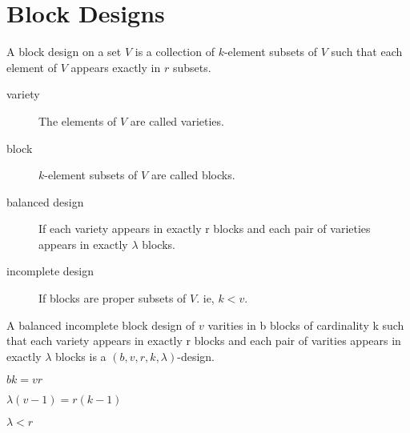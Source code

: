 
\section{Block Designs}
\begin{definition}
	A block design on a set $V$ is a collection of $k$-element subsets of $V$ such that each element of $V$ appears exactly in $r$ subsets.
\end{definition}

\begin{description}
	\item[variety] The elements of $V$ are called varieties.
	\item[block] $k$-element subsets of $V$ are called blocks.
	\item[balanced design] If each variety appears in exactly r blocks and each pair of varieties appears in exactly $\lambda$ blocks.
	\item[incomplete design] If blocks are proper subsets of $V$. ie, $k < v$.
\end{description}

\begin{definition}
	A balanced incomplete block design of $v$ varities in b blocks of cardinality k such that each variety appears in exactly r blocks and each pair of varities appears in exactly $\lambda$ blocks is a $(b,v,r,k,\lambda)$-design.
\end{definition}

\begin{theorem}
	$bk = vr$
\end{theorem}

\begin{theorem}
	$\lambda(v-1) = r(k-1)$
\end{theorem}
\begin{corollary}
	$\lambda < r$
\end{corollary}

